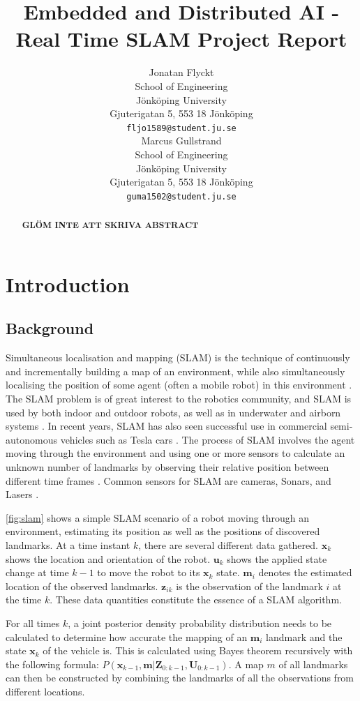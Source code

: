 \documentclass{article}
\title{Embedded and Distributed AI - Real Time SLAM Project Report}
\author{
 Jonatan Flyckt \\
  School of Engineering\\
  Jönköping University\\
  Gjuterigatan 5, 553 18 Jönköping \\
  \texttt{fljo1589@student.ju.se} \\
   \And
 Marcus Gullstrand \\
  School of Engineering\\
  Jönköping University\\
  Gjuterigatan 5, 553 18 Jönköping \\
  \texttt{guma1502@student.ju.se} \\
}
\begin{document}
\maketitle
\begin{abstract}

\textbf{GLÖM INTE ATT SKRIVA ABSTRACT}

\end{abstract}

\section{Introduction}
\subsection{Background}

Simultaneous localisation and mapping (SLAM) is the technique of continuously and incrementally building a map of an environment, while also simultaneously localising the position of some agent (often a mobile robot) in this environment \cite{background1}. The SLAM problem is of great interest to the robotics community, and SLAM is used by both indoor and outdoor robots, as well as in underwater and airborn systems \cite{background1}. In recent years, SLAM has also seen successful use in commercial semi-autonomous vehicles such as Tesla cars \cite{autonomous-cars}. The process of SLAM involves the agent moving through the environment and using one or more sensors to calculate an unknown number of landmarks by observing their relative position between different time frames \cite{background1}. Common sensors for SLAM are cameras, Sonars, and Lasers \cite{background2}.

\autoref{fig:slam} shows a simple SLAM scenario of a robot moving through an environment, estimating its position as well as the positions of discovered landmarks. At a time instant $k$, there are several different data gathered. $\textbf{x}_k$ shows the location and orientation of the robot. $\textbf{u}_k$ shows the applied state change at time $k-1$ to move the robot to its $\textbf{x}_k$ state. $\textbf{m}_i$ denotes the estimated location of the observed landmarks. $\textbf{z}_{ik}$ is the observation of the landmark $i$ at the time $k$. These data quantities constitute the essence of a SLAM algorithm. \cite{background1}

For all times $k$, a joint posterior density probability distribution needs to be calculated to determine how accurate the mapping of an $\textbf{m}_i$ landmark and the state $\textbf{x}_k$ of the vehicle is. This is calculated using Bayes theorem recursively with the following formula: $P(\textbf{x}_{k-1}, \textbf{m} | \textbf{Z}_{0:k-1}, \textbf{U}_{0:k-1})$. A map $m$ of all landmarks can then be constructed by combining the landmarks of all the observations from different locations. \cite{background1}
\end{document}
